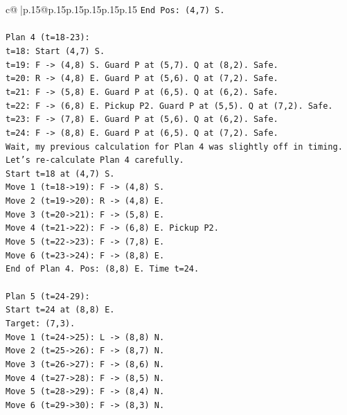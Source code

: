 \documentclass{article}
\begin{document}
{\begin{supertabular}{c@{$\;$}|p{.15\linewidth}@{}p{.15\linewidth}p{.15\linewidth}p{.15\linewidth}p{.15\linewidth}p{.15\linewidth}}
{{{\texttt{End Pos: (4,7) S.} \\
\\ 
\texttt{Plan 4 (t=18{-}23):} \\
\texttt{t=18: Start (4,7) S.} \\
\texttt{t=19: F {-}> (4,8) S. Guard P at (5,7). Q at (8,2). Safe.} \\
\texttt{t=20: R {-}> (4,8) E. Guard P at (5,6). Q at (7,2). Safe.} \\
\texttt{t=21: F {-}> (5,8) E. Guard P at (6,5). Q at (6,2). Safe.} \\
\texttt{t=22: F {-}> (6,8) E. Pickup P2. Guard P at (5,5). Q at (7,2). Safe.} \\
\texttt{t=23: F {-}> (7,8) E. Guard P at (5,6). Q at (6,2). Safe.} \\
\texttt{t=24: F {-}> (8,8) E. Guard P at (6,5). Q at (7,2). Safe.} \\
\texttt{Wait, my previous calculation for Plan 4 was slightly off in timing.} \\
\texttt{Let's re{-}calculate Plan 4 carefully.} \\
\texttt{Start t=18 at (4,7) S.} \\
\texttt{Move 1 (t=18{-}>19): F {-}> (4,8) S.} \\
\texttt{Move 2 (t=19{-}>20): R {-}> (4,8) E.} \\
\texttt{Move 3 (t=20{-}>21): F {-}> (5,8) E.} \\
\texttt{Move 4 (t=21{-}>22): F {-}> (6,8) E. Pickup P2.} \\
\texttt{Move 5 (t=22{-}>23): F {-}> (7,8) E.} \\
\texttt{Move 6 (t=23{-}>24): F {-}> (8,8) E.} \\
\texttt{End of Plan 4. Pos: (8,8) E. Time t=24.} \\
\\ 
\texttt{Plan 5 (t=24{-}29):} \\
\texttt{Start t=24 at (8,8) E.} \\
\texttt{Target: (7,3).} \\
\texttt{Move 1 (t=24{-}>25): L {-}> (8,8) N.} \\
\texttt{Move 2 (t=25{-}>26): F {-}> (8,7) N.} \\
\texttt{Move 3 (t=26{-}>27): F {-}> (8,6) N.} \\
\texttt{Move 4 (t=27{-}>28): F {-}> (8,5) N.} \\
\texttt{Move 5 (t=28{-}>29): F {-}> (8,4) N.} \\
\texttt{Move 6 (t=29{-}>30): F {-}> (8,3) N.} \\
}}}
\end{supertabular}}
\end{document}
